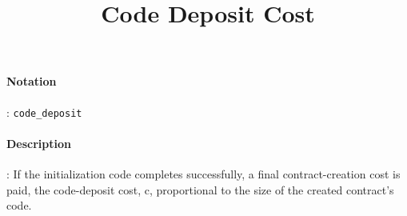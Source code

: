 \documentclass[10pt,a4paper,oneside]{scrartcl}
\author{}
\title{Code Deposit Cost}
\date{}
\begin{document}
\maketitle
\paragraph{Notation}: \texttt{code\_deposit}
\paragraph{Description}: If the initialization code completes successfully, a final contract-creation cost is paid, the code-deposit cost, c, proportional to the size of the created contract's code. 
\end{document}
